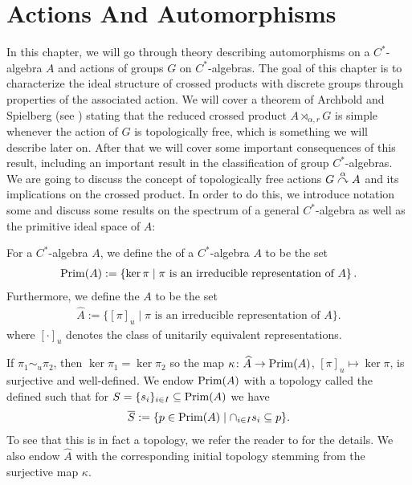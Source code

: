 \chapter{Actions And Automorphisms}
In this chapter, we will go through theory describing automorphisms on a $C^*$-algebra $A$ and actions of groups $G$ on $C^*$-algebras. The goal of this chapter is to characterize the ideal structure of crossed products with discrete groups through properties of the associated action. We will cover a theorem of Archbold and Spielberg (see \cite{archbold1994topologically}) stating that the reduced crossed product $A \rtimes_{\alpha,r} G$ is simple whenever the action of $G$ is topologically free, which is something we will describe later on. After that we will cover some important consequences of this result, including an important result in the classification of group $C^*$-algebras.
We are going to discuss the concept of topologically free actions $G \stackrel{\alpha}{\curvearrowright} A$ and its implications on the crossed product. In order to do this, we introduce notation some and discuss some results on the spectrum of a general $C^*$-algebra as well as the primitive ideal space of $A$:
\begin{definition}
	For a $C^*$-algebra $A$, we define the  of a $C^*$-algebra $A$ to be the set
	\begin{align*}
		\mathrm{Prim}(A) := \left\{ \ker \pi \mid \pi \text{ is an irreducible representation of } A \right\}.
	\end{align*}
	Furthermore, we define the  $A$ to be the set
	\begin{align*}
		\hat A := \{[\pi]_u \mid \pi \text{ is an irreducible representation of } A \}.
	\end{align*}
where $[\cdot]_u$ denotes the class of unitarily equivalent representations.

If $\pi_1 \sim_u \pi_2$, then $\ker \pi_1 = \ker \pi_2$ so the map $\kappa \colon \widehat{A} \to \mathrm{Prim}(A)$, $[\pi]_u \mapsto \ker \pi$, is surjective and well-defined. We endow $\mathrm{Prim}(A)$ with a topology called the  defined such that for $S = \{s_i\}_{i \in I} \subseteq \mathrm{Prim}(A)$ we have
\begin{align*}
	\overline S := \{ p \in \mathrm{Prim}(A) \mid \cap_{i \in I} s_i \subseteq p\}.
\end{align*}
To see that this is in fact a topology, we refer the reader to \cite[Appendix A.2]{williamsmorita} for the details. We also endow $\hat A$ with the corresponding initial topology stemming from the surjective map $\kappa$.
\end{definition}
